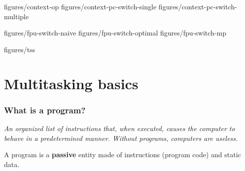 
%
%

%


		{figures/context-op}
		{figures/context-pc-switch-single}
		{figures/context-pc-switch-multiple}


		{figures/fpu-switch-naive}
		{figures/fpu-switch-optimal}
		{figures/fpu-switch-mp}


		{figures/tss}


%
%

\section{Multitasking basics}


\begin{frame}
  \frametitle{What is a program?}

  \emph{An organized list of instructions that, when executed, causes
  the computer to behave in a predetermined manner. Without programs,
  computers are useless.}

  \-

  A program is a \textbf{passive} entity made of instructions (program
  code) and static data.

\end{frame}


